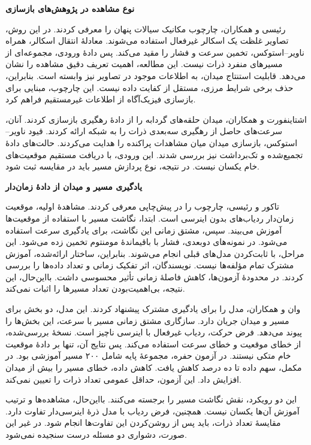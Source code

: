 \textbf{نوع مشاهده در پژوهش‌های بازسازی}

رئیسی و همکاران، چارچوب مکانیک سیالات پنهان را معرفی کردند.
در این روش، تصاویر غلظت یک اسکالر غیرفعال استفاده می‌شوند.
معادلهٔ انتقال اسکالر، همراه ناویر–استوکس، تخمین سرعت و فشار را مقید می‌کند.
پس دادهٔ ورودی، مجموعه‌ای از مسیرهای منفرد ذرات نیست.
این مطالعه، اهمیت تعریف دقیق مشاهده را نشان می‌دهد.
قابلیت استنتاج میدان، به اطلاعات موجود در تصاویر نیز وابسته است.
بنابراین، حذف برخی شرایط مرزی، مستقل از کفایت داده نیست.
این چارچوب، مبنایی برای بازسازی فیزیک‌آگاه از اطلاعات غیرمستقیم فراهم کرد.
\cite{Raissi2020HFM}

اشتاینفورت و همکاران، میدان حلقه‌های گردابه را از دادهٔ رهگیری بازسازی کردند.
آنان، سرعت‌های حاصل از رهگیری سه‌بعدی ذرات را به شبکه ارائه کردند.
قیود ناویر–استوکس، بازسازی میدان میان مشاهدات پراکنده را هدایت می‌کردند.
حالت‌های دادهٔ تجمیع‌شده و تک‌برداشت نیز بررسی شدند.
این ورودی، با دریافت مستقیم موقعیت‌های خام یکسان نیست.
در نتیجه، نوع پردازش مسیر باید در مقایسه ثبت شود.
\cite{Steinfurth2024}

\textbf{یادگیری مسیر و میدان از دادهٔ زمان‌دار}

تاکور و رئیسی، چارچوب  را در پیش‌چاپی معرفی کردند.
مشاهدهٔ اولیه، موقعیت زمان‌دار ردیاب‌های بدون اینرسی است.
ابتدا، نگاشت مسیر با استفاده از موقعیت‌ها آموزش می‌بیند.
سپس، مشتق زمانی این نگاشت، برای یادگیری سرعت استفاده می‌شود.
در نمونه‌های دوبعدی، فشار با باقیماندهٔ مومنتوم تخمین زده می‌شود.
این مراحل، با ثابت‌کردن مدل‌های قبلی انجام می‌شوند.
بنابراین، ساختار ارائه‌شده، آموزش مشترک تمام مؤلفه‌ها نیست.
نویسندگان، اثر تفکیک زمانی و تعداد داده‌ها را بررسی کردند.
در محدودهٔ آزمون‌ها، کاهش فاصلهٔ زمانی تأثیر محسوسی داشت.
بااین‌حال، این نتیجه، بی‌اهمیت‌بودن تعداد مسیرها را اثبات نمی‌کند.
\cite{Thakur2025ELPINN}

وان و همکاران، مدل  را برای یادگیری مشترک پیشنهاد کردند.
این مدل، دو بخش برای مسیر و میدان جریان دارد.
سازگاری مشتق زمانی مسیر با سرعت، این بخش‌ها را پیوند می‌دهد.
فرض حرکت، ردیاب غیرفعال با اینرسی ناچیز است.
نسخهٔ بررسی‌شده، از خطای موقعیت و خطای سرعت استفاده می‌کند.
پس نتایج آن، تنها بر دادهٔ موقعیت خام متکی نیستند.
در آزمون حفره، مجموعهٔ پایه شامل ۲۰۰ مسیر آموزشی بود.
در مکمل، سهم داده تا ده درصد کاهش یافت.
کاهش داده، خطای مسیر را بیش از میدان افزایش داد.
این آزمون، حداقل عمومی تعداد ذرات را تعیین نمی‌کند.
\cite{Wan2026TrajectoryFlowNet}

این دو رویکرد، نقش نگاشت مسیر را برجسته می‌کنند.
بااین‌حال، مشاهده‌ها و ترتیب آموزش آن‌ها یکسان نیست.
همچنین، فرض ردیاب با مدل ذرهٔ اینرسی‌دار تفاوت دارد.
مقایسهٔ تعداد ذرات، باید پس از روشن‌کردن این تفاوت‌ها انجام شود.
در غیر این صورت، دشواری دو مسئله درست سنجیده نمی‌شود.

